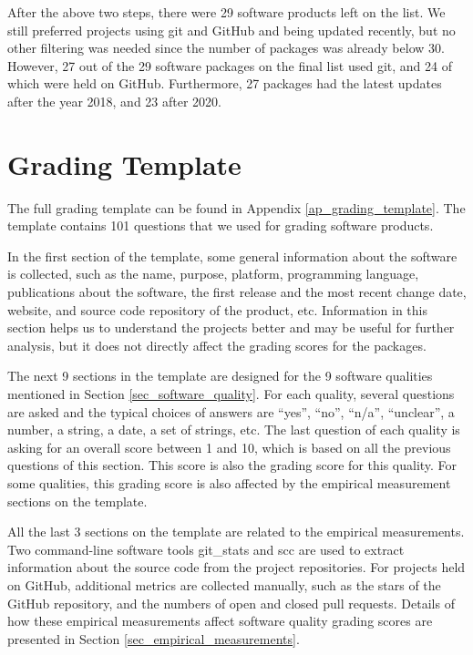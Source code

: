 After the above two steps, there were 29 software products left on the list. We still preferred projects using git and GitHub and being updated recently, but no other filtering was needed since the number of packages was already below 30. However, 27 out of the 29 software packages on the final list used git, and 24 of which were held on GitHub. Furthermore, 27 packages had the latest updates after the year 2018, and 23 after 2020.

\section{Grading Template}
\label{sec_grading_template}
The full grading template can be found in Appendix \ref{ap_grading_template}. The template contains 101 questions that we used for grading software products.

In the first section of the template, some general information about the software is collected, such as the name, purpose, platform, programming language, publications about the software, the first release and the most recent change date, website, and source code repository of the product, etc. Information in this section helps us to understand the projects better and may be useful for further analysis, but it does not directly affect the grading scores for the packages.

The next 9 sections in the template are designed for the 9 software qualities mentioned in Section \ref{sec_software_quality}. For each quality, several questions are asked and the typical choices of answers are ``yes'', ``no'', ``n/a'', ``unclear'', a number, a string, a date, a set of strings, etc. The last question of each quality is asking for an overall score between 1 and 10, which is based on all the previous questions of this section. This score is also the grading score for this quality. For some qualities, this grading score is also affected by the empirical measurement sections on the template.

All the last 3 sections on the template are related to the empirical measurements. Two command-line software tools git\_stats and scc are used to extract information about the source code from the project repositories. For projects held on GitHub, additional metrics are collected manually, such as the stars of the GitHub repository, and the numbers of open and closed pull requests. Details of how these empirical measurements affect software quality grading scores are presented in Section \ref{sec_empirical_measurements}.

